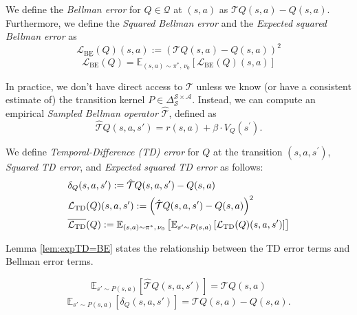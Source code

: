 \begin{defn}\label{def:BE}
    We define the \textit{Bellman error} for $Q\in\mathcal{Q}$ at $(s,a)$ as $\mathcal{T}Q(s, a) - Q(s, a)$. Furthermore, we define the \textit{Squared Bellman error} and the \textit{Expected squared Bellman error}  as $$\mathcal{L}_{\text{BE}}(Q)(s, a) := \left( \mathcal{T}Q(s, a) - Q(s, a) \right)^2$$
$$
\overline{
\mathcal{L}_{\text{BE}}}(Q) = \mathbb{E}_{(s, a) \sim \pi^*,\, \nu_0} \left[ \mathcal{L}_{\text{BE}}(Q)(s, a) \right]
$$
\end{defn}

\noindent In practice, we don't have direct access to $\mathcal{T}$ unless we know (or have a consistent estimate of) the transition kernel $P\in\Delta_\mathcal{S}^{\mathcal{S}\times\mathcal{A}}$. Instead, we can compute an empirical \textit{Sampled Bellman operator} $\hat{\mathcal{T}}$, defined as 
$$
\hat{\mathcal{T}}Q(s, a, s') = r(s, a) + \beta \cdot V_Q(s^\prime).
$$
\begin{defn}
    We define \textit{Temporal-Difference (TD) error} for $Q$ at the transition $(s, a, s^\prime)$, \textit{Squared TD error}, and \textit{Expected squared TD error} as follows:
\begin{align}
    &\delta_Q(s, a, s'):=\hat{\mathcal{T}}Q(s, a, s') - Q(s, a) \notag
    \\
 &\mathcal{L}_{\text{TD}}(Q)(s,a,s^\prime):= \left(\hat{\mathcal{T}}Q(s, a, s') - Q(s, a)\right)^2 \notag
 \\
 &\overline{
\mathcal{L}_{\text{TD}}}(Q) := \mathbb{E}_{(s, a) \sim \pi^*,\, \nu_0} \left[ \mathbb{E}_{s' \sim P(s, a)} \left[ \mathcal{L}_{\text{TD}}(Q)(s, a, s') \right] \right] \notag
\end{align}
\end{defn}

\noindent Lemma \ref{lem:expTD=BE} states the relationship between the TD error terms and Bellman error terms.
\begin{lem}
\label{lem:expTD=BE}
    $$ \mathbb{E}_{s' \sim P(s, a)} \left[ \hat{\mathcal{T}}Q(s, a, s') \right] = \mathcal{T}Q(s, a) 
    $$
    $$
    \mathbb{E}_{s' \sim P(s, a)} \left[ \delta_Q(s, a, s')\right] =\mathcal{T}Q(s, a) - Q(s, a). $$
\end{lem}



